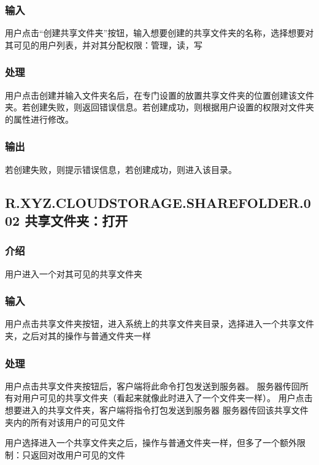 \subsubsection{输入} 

用户点击“创建共享文件夹”按钮，输入想要创建的共享文件夹的名称，选择想要对其可见的用户列表，并对其分配权限：管理，读，写

\subsubsection{处理} 

用户点击创建并输入文件夹名后，在专门设置的放置共享文件夹的位置创建该文件夹。若创建失败，则返回错误信息。若创建成功，则根据用户设置的权限对文件夹的属性进行修改。

\subsubsection{输出} 

若创建失败，则提示错误信息，若创建成功，则进入该目录。

\subsection{R.XYZ.CLOUDSTORAGE.SHAREFOLDER.002 共享文件夹：打开}

\subsubsection{介绍}

用户进入一个对其可见的共享文件夹

\subsubsection{输入} 

用户点击共享文件夹按钮，进入系统上的共享文件夹目录，选择进入一个共享文件夹，之后对其的操作与普通文件夹一样

\subsubsection{处理} 

用户点击共享文件夹按钮后，客户端将此命令打包发送到服务器。
服务器传回所有对用户可见的共享文件夹（看起来就像此时进入了一个文件夹一样）。
用户点击想要进入的共享文件夹，客户端将指令打包发送到服务器
服务器传回该共享文件夹内的所有对该用户的可见文件

用户选择进入一个共享文件夹之后，操作与普通文件夹一样，但多了一个额外限制：只返回对改用户可见的文件

